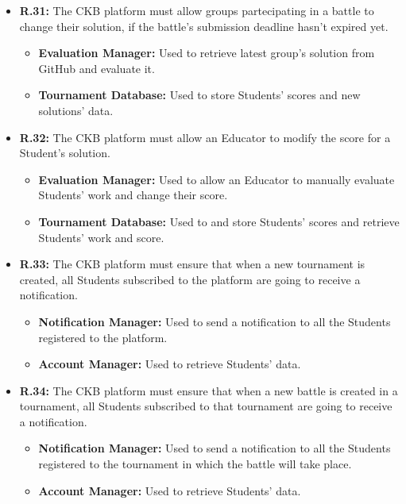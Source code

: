 \documentclass{article}
\begin{document}
{\begin{itemize}
\begin{itemize}
          \end{itemize}
    \item \textbf{R.31:} The CKB platform must allow groups partecipating in a battle to change their solution,
          if the battle's submission deadline hasn't expired yet.
          \begin{itemize}
            \item \textbf{Evaluation Manager:} Used to retrieve latest group's solution from GitHub and evaluate it.
              \item \textbf{Tournament Database:} Used to store Students' scores and new solutions' data.
          \end{itemize}
    \item \textbf{R.32:} The CKB platform must allow an Educator to modify the score for a Student's solution.
          \begin{itemize}
              \item \textbf{Evaluation Manager:} Used to allow an Educator to manually evaluate Students'
              work and change their score.
              \item \textbf{Tournament Database:} Used to and store Students' scores and retrieve Students' work and score.
          \end{itemize}
    \item \textbf{R.33:} The CKB platform must ensure that when a new tournament is created, all
          Students subscribed to the platform are going to receive a notification.
          \begin{itemize}
              \item \textbf{Notification Manager:} Used to send a notification to all the Students
              registered to the platform.
              \item \textbf{Account Manager:} Used to retrieve Students' data.
          \end{itemize}
    \item \textbf{R.34:} The CKB platform must ensure that when a new battle is created in a tournament,
          all Students subscribed to that tournament are going to receive a notification.
          \begin{itemize}
              \item \textbf{Notification Manager:} Used to send a notification to all the Students
              registered to the tournament in which the battle will take place.
              \item \textbf{Account Manager:} Used to retrieve Students' data.

\end{itemize}
\end{itemize}}
\end{document}
